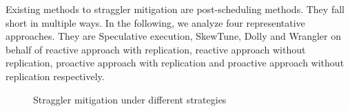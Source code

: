 \documentclass[10pt,conference,compsocconf,letterpaper]{IEEEtran}
\begin{document}
  Existing methods to straggler mitigation are post-scheduling methods. They fall short in multiple ways. In the following, we analyze four representative approaches. They are Speculative execution, SkewTune, Dolly and Wrangler on behalf of reactive approach with replication, reactive approach without replication, proactive approach with replication and proactive approach without replication respectively.
  \begin{figure}[htbp]
    \centering
    \hfill
    \hfill
    \caption{Straggler mitigation under different strategies}
    \label{Fig. 3:}
  \end{figure}
\end{document}
